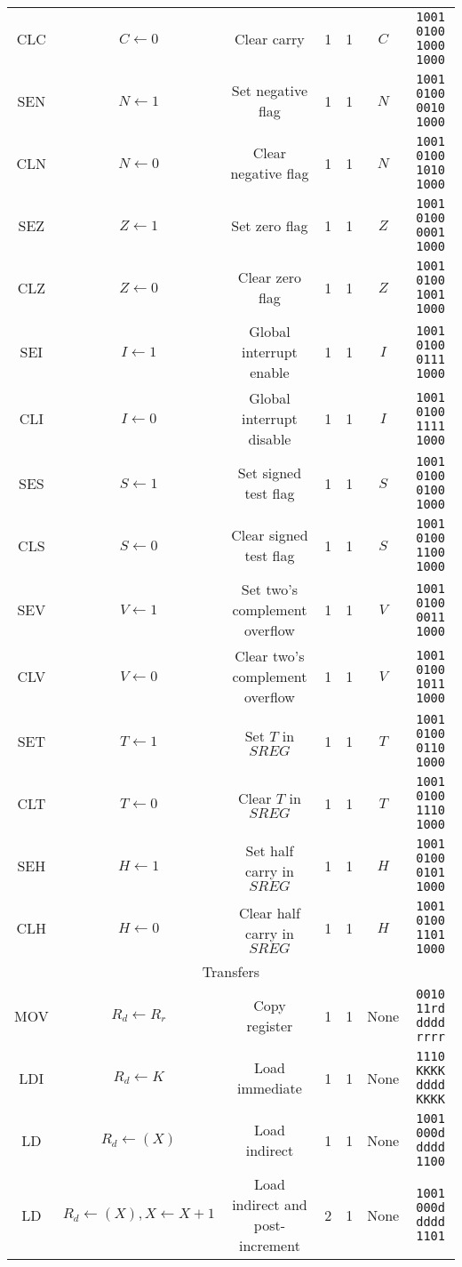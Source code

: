 \documentclass[11pt]{article}
\begin{document}
\begin{center}
\begin{longtable}{|c|c|c|c|c|c|c|}
CLC & $C \leftarrow 0$ & Clear carry & 1 & 1 & $C$ & \texttt{1001 0100 1000 1000}\\
SEN & $N \leftarrow 1$ & Set negative flag & 1 & 1 & $N$ & \texttt{1001 0100 0010 1000}\\
CLN & $N \leftarrow 0$ & Clear negative flag & 1 & 1 & $N$ & \texttt{1001 0100 1010 1000}\\
SEZ & $Z \leftarrow 1$ & Set zero flag & 1 & 1 & $Z$ & \texttt{1001 0100 0001 1000}\\
CLZ & $Z \leftarrow 0$ & Clear zero flag & 1 & 1 & $Z$ & \texttt{1001 0100 1001 1000}\\
SEI & $I \leftarrow 1$ & Global interrupt enable & 1 & 1 & $I$ & \texttt{1001 0100 0111 1000}\\
CLI & $I \leftarrow 0$ & Global interrupt disable & 1 & 1 & $I$ & \texttt{1001 0100 1111 1000}\\
SES & $S \leftarrow 1$ & Set signed test flag & 1 & 1 & $S$ & \texttt{1001 0100 0100 1000}\\
CLS & $S \leftarrow 0$ & Clear signed test flag & 1 & 1 & $S$ & \texttt{1001 0100 1100 1000}\\
SEV & $V \leftarrow 1$ & Set two's complement overflow & 1 & 1 & $V$ & \texttt{1001 0100 0011 1000}\\
CLV & $V \leftarrow 0$ & Clear two's complement overflow & 1 & 1 & $V$ & \texttt{1001 0100 1011 1000}\\
SET & $T \leftarrow 1$ & Set $T$ in $SREG$ & 1 & 1 & $T$ & \texttt{1001 0100 0110 1000}\\
CLT & $T \leftarrow 0$ & Clear $T$ in $SREG$ & 1 & 1 & $T$ & \texttt{1001 0100 1110 1000}\\
SEH & $H \leftarrow 1$ & Set half carry in $SREG$ & 1 & 1 & $H$ & \texttt{1001 0100 0101 1000}\\
CLH & $H \leftarrow 0$ & Clear half carry in $SREG$ & 1 & 1 & $H$ & \texttt{1001 0100 1101 1000}\\
\hline\hline
\multicolumn{7}{|c|}{Transfers} \\
\hline
MOV & $R_d \leftarrow R_r$ & Copy register & 1 & 1 & None & \texttt{0010 11rd dddd rrrr}\\
LDI & $R_d \leftarrow K$ & Load immediate & 1 & 1 & None & \texttt{1110 KKKK dddd KKKK}\\
LD & $R_d \leftarrow (X)$ & Load indirect & 1 & 1 & None & \texttt{1001 000d dddd 1100}\\
LD & $R_d \leftarrow (X), X \leftarrow X + 1$ & Load indirect and post-increment & 2 & 1 & None & \texttt{1001 000d dddd 1101}\\

\end{longtable}
\end{center}
\end{document}
